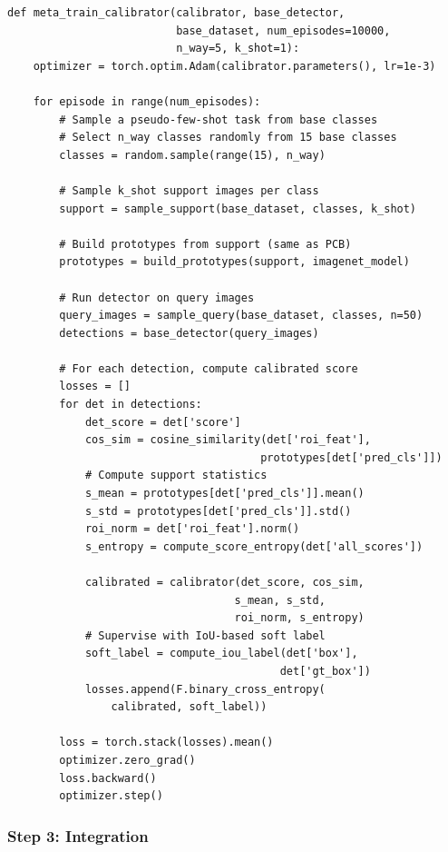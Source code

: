 \documentclass[11pt,a4paper]{article}
\begin{document}
\begin{lstlisting}[caption={Meta-training loop for calibration network}]
def meta_train_calibrator(calibrator, base_detector,
                          base_dataset, num_episodes=10000,
                          n_way=5, k_shot=1):
    optimizer = torch.optim.Adam(calibrator.parameters(), lr=1e-3)

    for episode in range(num_episodes):
        # Sample a pseudo-few-shot task from base classes
        # Select n_way classes randomly from 15 base classes
        classes = random.sample(range(15), n_way)

        # Sample k_shot support images per class
        support = sample_support(base_dataset, classes, k_shot)

        # Build prototypes from support (same as PCB)
        prototypes = build_prototypes(support, imagenet_model)

        # Run detector on query images
        query_images = sample_query(base_dataset, classes, n=50)
        detections = base_detector(query_images)

        # For each detection, compute calibrated score
        losses = []
        for det in detections:
            det_score = det['score']
            cos_sim = cosine_similarity(det['roi_feat'],
                                       prototypes[det['pred_cls']])
            # Compute support statistics
            s_mean = prototypes[det['pred_cls']].mean()
            s_std = prototypes[det['pred_cls']].std()
            roi_norm = det['roi_feat'].norm()
            s_entropy = compute_score_entropy(det['all_scores'])

            calibrated = calibrator(det_score, cos_sim,
                                   s_mean, s_std,
                                   roi_norm, s_entropy)
            # Supervise with IoU-based soft label
            soft_label = compute_iou_label(det['box'],
                                          det['gt_box'])
            losses.append(F.binary_cross_entropy(
                calibrated, soft_label))

        loss = torch.stack(losses).mean()
        optimizer.zero_grad()
        loss.backward()
        optimizer.step()
\end{lstlisting}

\subsubsection{Step 3: Integration}
\end{document}
